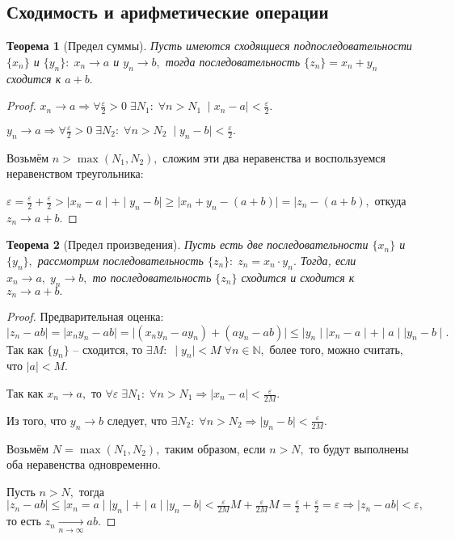 \documentclass{article}
\newtheorem{Theorem}{Теорема}[section]
\begin{document}
\subsection{Сходимость и арифметические операции}
\begin{Theorem}[Предел суммы]

Пусть имеются сходящиеся подпоследовательности $\{x_n\}$ и $\{y_n\}: \; x_n\rightarrow a$ и $y_n\rightarrow b,$ тогда последовательность $\{z_n\}=x_n+y_n$ сходится к $a+b.$
\end{Theorem}
\begin{proof}
$x_n\rightarrow a \Rightarrow \forall \frac{\varepsilon}{2}>0 \; \exists N_1: \; \forall n>N_1 \; \mid x_n-a\mid<\frac{\varepsilon}{2}.$

$y_n\rightarrow a \Rightarrow \forall \frac{\varepsilon}{2}>0 \; \exists N_2: \; \forall n>N_2 \; \mid y_n-b\mid<\frac{\varepsilon}{2}.$

Возьмём $n>\max(N_1, N_2),$ сложим эти два неравенства и воспользуемся неравенством треугольника:

$\varepsilon=\frac{\varepsilon}{2}+\frac{\varepsilon}{2}>\mid x_n-a\mid+\mid y_n-b\mid \geq \mid x_n+y_n-(a+b)\mid = \mid z_n-(a+b),$ откуда $z_n \rightarrow a+b.$
\end{proof}

\begin{Theorem}[Предел произведения]
Пусть есть две последовательности $\{x_n\}$ и $\{y_n\},$  рассмотрим последовательность $\{z_n\}: \; z_n=x_n\cdot y_n.$ Тогда, если $x_n\rightarrow a, \; y_n\rightarrow b,$ то последовательность $\{z_n\}$ сходится и сходится к $z_n\rightarrow a+b.$
\end{Theorem}
\begin{proof}
Предварительная оценка: $\mid z_n-ab\mid=\mid x_n y_n-ab\mid=\mid(x_ny_n-ay_n)+(ay_n-ab)\mid\leq\mid y_n\mid\mid x_n-a\mid+\mid a\mid\mid y_n-b\mid.$ Так как $\{y_n\}$ -- сходится, то $\exists M: \; \mid y_n\mid<M \; \forall n\in\mathbb{N},$ более того, можно считать, что $\mid a\mid<M.$

Так как $x_n\rightarrow a,$ то $\forall\varepsilon\;\exists N_1: \; \forall n>N_1 \Rightarrow\mid x_n-a\mid<\frac{\varepsilon}{2M}.$

Из того, что $y_n\rightarrow b$ следует, что $\exists N_2: \; \forall n>N_2 \Rightarrow \mid y_n-b\mid<\frac{\varepsilon}{2M}.$

Возьмём $N=\max(N_1, N_2),$ таким образом, если $n>N,$ то будут выполнены оба неравенства одновременно.

Пусть $n>N,$ тогда $\mid z_n-ab\mid\leq\mid x_n=a\mid\mid y_n\mid+\mid a\mid\mid y_n-b\mid<\frac{\varepsilon}{2M}M+\frac{\varepsilon}{2M}M=\frac{\varepsilon}{2}+\frac{\varepsilon}{2}=\varepsilon \Rightarrow \mid z_n-ab\mid<\varepsilon,$ то есть $z_n\xrightarrow[n\rightarrow\infty]{} ab.$
\end{proof}
\end{document}
